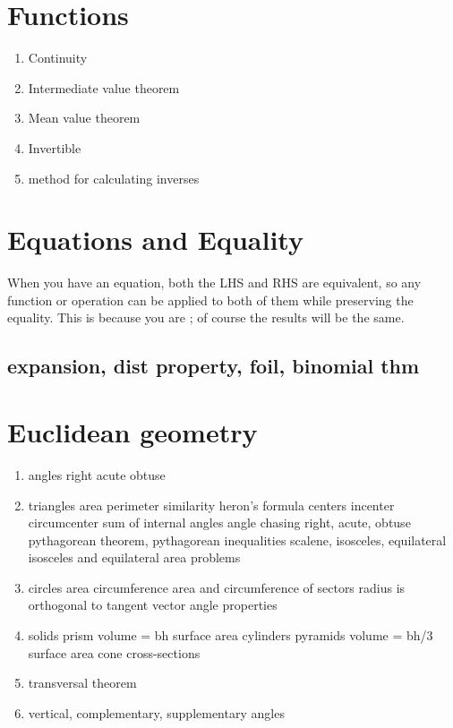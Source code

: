 \documentclass[12pt,paper=letter]{article}
\begin{document}
    \section{Functions}

    \begin{enumerate}
        \item Continuity
        \item Intermediate value theorem
        \item Mean value theorem
        \item Invertible
        \item method for calculating inverses
    \end{enumerate}


    \section{Equations and Equality}
    When you have an equation,
    both the LHS and RHS are equivalent,
    so any function or operation can be applied to both of them while preserving the equality.
    This is because you are ;
    of course the results will be the same.

    \subsection{expansion, dist property, foil, binomial thm}


    \section{Euclidean geometry}

    \begin{enumerate}
        \item angles
        \subitem right
        \subitem acute
        \subitem obtuse
        \item triangles
        \subitem area
        \subitem perimeter
        \subitem similarity
        \subitem heron's formula
        \subitem centers
        \subsubitem incenter
        \subsubitem circumcenter
        \subitem sum of internal angles
        \subsubitem angle chasing
        \subitem right, acute, obtuse
        \subsubitem pythagorean theorem, pythagorean inequalities
        \subitem scalene, isosceles, equilateral
        \subsubitem isosceles and equilateral area problems
        \item circles
        \subitem area
        \subitem circumference
        \subitem area and circumference of sectors
        \subitem radius is orthogonal to tangent vector
        \subitem angle properties
        \item solids
        \subitem prism
        \subsubitem volume = bh
        \subsubitem surface area
        \subitem cylinders
        \subitem pyramids
        \subsubitem volume = bh/3
        \subsubitem surface area
        \subitem cone
        \subitem cross-sections
        \item transversal theorem
        \item vertical, complementary, supplementary angles
    \end{enumerate}
\end{document}
